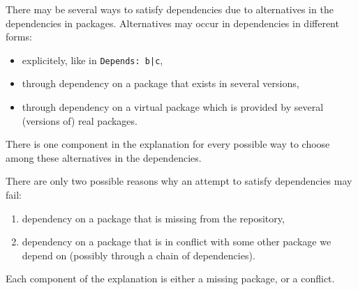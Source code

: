 There may be several ways to satisfy dependencies due to alternatives
in the dependencies in packages. Alternatives may occur in dependencies
in different forms:
\begin{itemize}
\item explicitely, like in \texttt{Depends: b|c},
\item through dependency on a package that exists in several versions,
\item through dependency on a virtual package which is provided by several
  (versions of) real packages.
\end{itemize}
There is one component in the explanation for every possible way to
choose among these alternatives in the dependencies.

There are only two possible reasons why an attempt to satisfy dependencies
may fail:
\begin{enumerate}
\item dependency on a package that is missing from the repository,
\item dependency on a package that is in conflict with some other package
  we depend on (possibly through a chain of dependencies).
\end{enumerate}
Each component of the explanation is either a missing package, or a conflict. 

